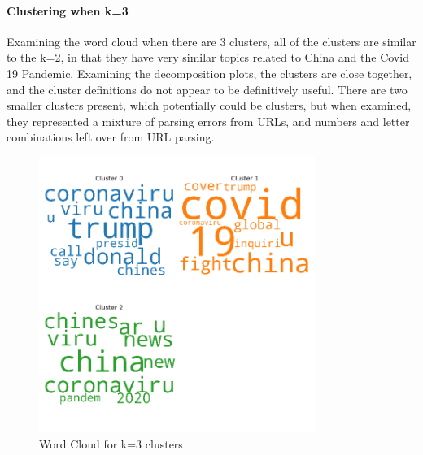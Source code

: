 \paragraph{Clustering when k=3} 
Examining the word cloud when there are 3 clusters, all of the clusters are similar to the k=2, in that they have very similar topics related to China and the Covid 19 Pandemic. Examining the decomposition plots, the clusters are close together, and the cluster definitions do not appear to be definitively useful. There are two smaller clusters present, which potentially could be clusters, but when examined, they represented a mixture of parsing errors from URLs, and numbers and letter combinations left over from URL parsing.  
\begin{figure}[H]
	\centering
	\includegraphics[width=0.8\textwidth]{images/kmeans_word_cloud_k=3.png}
	\caption{Word Cloud for k=3 clusters}
	\label{fig:wck3}
\end{figure}

